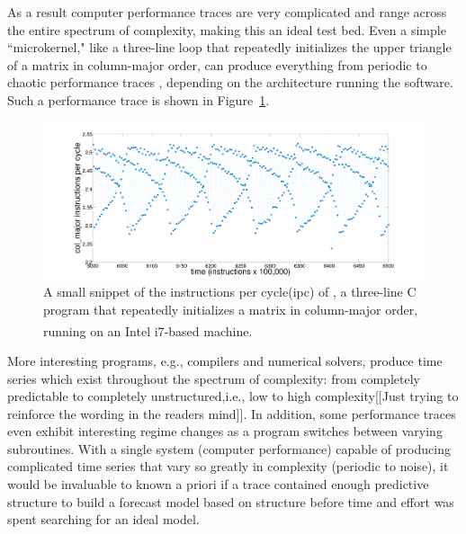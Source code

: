 As a result computer performance traces are very
complicated and range across the entire spectrum of complexity, making this an ideal test bed.  Even a simple ``microkernel," like a three-line loop that
repeatedly initializes the upper triangle of a matrix in column-major order, can produce everything from periodic to
chaotic performance traces \cite{mytkowicz09}, depending on the architecture running the software. Such a performance trace is shown in
Figure~\ref{fig:ipc}.%
%
 \begin{figure}[htbp]
    \centering
    \includegraphics[width=\textwidth]{figs/colshortts}
    \caption{A small snippet of the instructions per cycle(ipc) of \col, a three-line C program that repeatedly initializes
      a matrix in column-major order, running on an Intel i7\textsuperscript{\textregistered}-based machine.}
   \label{fig:ipc}
  \end{figure}
%
More interesting programs, e.g., compilers and numerical solvers, produce time series which exist throughout the spectrum of complexity: from completely predictable to completely unstructured,i.e., low to high complexity[[Just trying to reinforce the wording in the readers mind]]. In addition, some performance traces even exhibit interesting regime changes as a program switches between varying subroutines. With a single system (computer performance) capable of producing complicated time series that vary so greatly in complexity (periodic to noise), it would be invaluable to known a priori if a trace contained enough predictive structure to build a  forecast model based on structure before time and effort was spent searching for an ideal model.

